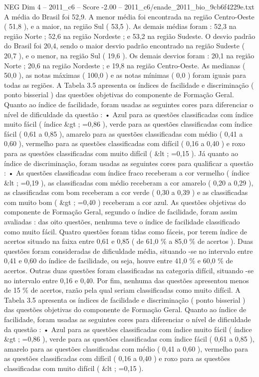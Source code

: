 \begin{textsample}{NEG Dim 4 – 2011\_c6 – Score -2.00 – 2011\_c6/enade\_2011\_bio\_9cb6f4229e.txt}
A média do Brasil foi 52,9.
A menor média foi encontrada na região Centro-Oeste ( 51,8 ), e a maior, na região Sul ( 53,5 ).
As demais médias foram : 52,3 na região Norte ; 52,6 na região Nordeste ; e 53,2 na região Sudeste.
O desvio padrão do Brasil foi 20,4, sendo o maior desvio padrão encontrado na região Sudeste ( 20,7 ), e o menor, na região Sul ( 19,6 ).
Os demais desvios foram : 20,1 na região Norte ; 20,6 na região Nordeste ; e 19,8 na região Centro-Oeste.
As medianas ( 50,0 ), as notas máximas ( 100,0 ) e as notas mínimas ( 0,0 ) foram iguais para todas as regiões.
A Tabela 3.5 apresenta os índices de facilidade e discriminação ( ponto bisserial ) das questões objetivas do componente de Formação Geral.
Quanto ao índice de facilidade, foram usadas as seguintes cores para diferenciar o nível de dificuldade da questão : • Azul para as questões classificadas com índice muito fácil ( índice \&gt ; =0,86 ), verde para as questões classificadas com índice fácil ( 0,61 a 0,85 ), amarelo para as questões classificadas com médio ( 0,41 a 0,60 ), vermelho para as questões classificadas com difícil ( 0,16 a 0,40 ) e roxo para as questões classificadas com muito difícil ( \&lt ; =0,15 ).
Já quanto ao índice de discriminação, foram usadas as seguintes cores para qualificar a questão : • As questões classificadas com índice fraco receberam a cor vermelho ( índice \&lt ; =0,19 ), as classificadas com médio receberam a cor amarelo ( 0,20 a 0,29 ), as classificadas com bom receberam a cor verde ( 0,30 a 0,39 ) e as classificadas com muito bom ( \&gt ; =0,40 ) receberam a cor azul.
As questões objetivas do componente de Formação Geral, segundo o índice de facilidade, foram assim avaliadas : das oito questões, nenhuma teve o índice de facilidade classificado como muito fácil.
Quatro questões foram tidas como fáceis, por terem índice de acertos situado na faixa entre 0,61 e 0,85 ( de 61,0 \% a 85,0 \% de acertos ).
Duas questões foram consideradas de dificuldade média, situando -se no intervalo entre 0,41 e 0,60 do índice de facilidade, ou seja, houve entre 41,0 \% e 60,0 \% de acertos.
Outras duas questões foram classificadas na categoria difícil, situando -se no intervalo entre 0,16 e 0,40.
Por fim, nenhuma das questões apresentou menos de 15 \% de acertos, razão pela qual seriam classificadas como muito difícil.
A Tabela 3.5 apresenta os índices de facilidade e discriminação ( ponto bisserial ) das questões objetivas do componente de Formação Geral.
Quanto ao índice de facilidade, foram usadas as seguintes cores para diferenciar o nível de dificuldade da questão : • Azul para as questões classificadas com índice muito fácil ( índice \&gt ; =0,86 ), verde para as questões classificadas com índice fácil ( 0,61 a 0,85 ), amarelo para as questões classificadas com médio ( 0,41 a 0,60 ), vermelho para as questões classificadas com difícil ( 0,16 a 0,40 ) e roxo para as questões classificadas com muito difícil ( \&lt ; =0,15 ).

\end{textsample}
